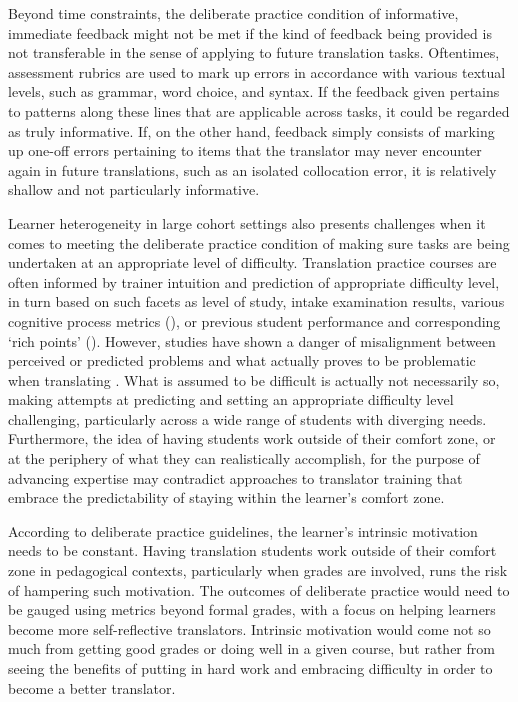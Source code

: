 \documentclass[output=paper]{langscibook}
\begin{document}
Beyond time constraints, the deliberate practice condition of informative, immediate feedback might not be met if the kind of feedback being provided is not transferable in the sense of applying to future translation tasks. Oftentimes, assessment rubrics are used to mark up errors in accordance with various textual levels, such as grammar, word choice, and syntax. If the feedback given pertains to patterns along these lines that are applicable across tasks, it could be regarded as truly informative. If, on the other hand, feedback simply consists of marking up one-off errors pertaining to items that the translator may never encounter again in future translations, such as an isolated collocation error, it is relatively shallow and not particularly informative.

Learner heterogeneity in large cohort settings also presents challenges when it comes to meeting the deliberate practice condition of making sure tasks are being undertaken at an appropriate level of difficulty. Translation practice courses are often informed by trainer intuition and prediction of appropriate difficulty level, in turn based on such facets as level of study, intake examination results, various cognitive process metrics (\citealt{sunshreve14}), or previous student performance and corresponding ‘rich points’ (\citealt{pacte11}). However, studies have shown a danger of misalignment between perceived or predicted problems and what actually proves to be problematic when translating \citep{angelone2018}. What is assumed to be difficult is actually not necessarily so, making attempts at predicting and setting an appropriate difficulty level challenging, particularly across a wide range of students with diverging needs. Furthermore, the idea of having students work outside of their comfort zone, or at the periphery of what they can realistically accomplish, for the purpose of advancing expertise may contradict approaches to translator training that embrace the predictability of staying within the learner’s comfort zone.

According to deliberate practice guidelines, the learner’s intrinsic motivation needs to be constant. Having translation students work outside of their comfort zone in pedagogical contexts, particularly when grades are involved, runs the risk of hampering such motivation. The outcomes of deliberate practice would need to be gauged using metrics beyond formal grades, with a focus on helping learners become more self-reflective translators. Intrinsic motivation would come not so much from getting good grades or doing well in a given course, but rather from seeing the benefits of putting in hard work and embracing difficulty in order to become a better translator.~
\end{document}
